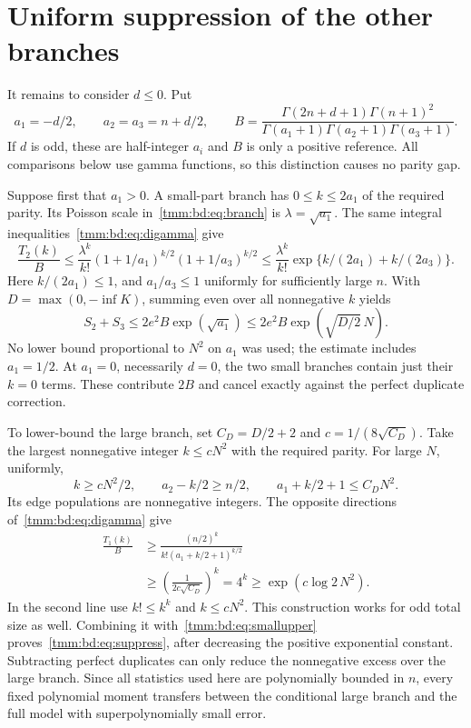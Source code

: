 \documentclass[11pt,letterpaper]{article}
\theoremstyle{remark}\newtheorem{remark}[theorem]{Remark}
\begin{document}
\section{Uniform suppression of the other branches}\label{tmm:bd:sec:suppression}
It remains to consider $d\le0$. Put
\[
 a_1=-d/2,\qquad a_2=a_3=n+d/2,\qquad
 B=\frac{\Gamma(2n+d+1)\Gamma(n+1)^2}
 {\Gamma(a_1+1)\Gamma(a_2+1)\Gamma(a_3+1)}.
\]
If $d$ is odd, these are half-integer $a_i$ and $B$ is only a positive reference. All comparisons below use gamma functions, so this distinction causes no parity gap.

Suppose first that $a_1>0$. A small-part branch has $0\le k\le2a_1$ of the required parity. Its Poisson scale in~\eqref{tmm:bd:eq:branch} is $\lambda=\sqrt{a_1}$. The same integral inequalities~\eqref{tmm:bd:eq:digamma} give
\[
 \frac{T_2(k)}B\le\frac{\lambda^k}{k!}
 (1+1/a_1)^{k/2}(1+1/a_3)^{k/2}
 \le\frac{\lambda^k}{k!}\exp\{k/(2a_1)+k/(2a_3)\}.
\]
Here $k/(2a_1)\le1$, and $a_1/a_3\le1$ uniformly for sufficiently large $n$. With $D=\max(0,-\inf K)$, summing even over all nonnegative $k$ yields
\begin{equation}\label{tmm:bd:eq:smallupper}
 S_2+S_3\le2e^2B\exp(\sqrt{a_1})
 \le2e^2B\exp(\sqrt{D/2}\,N).
\end{equation}
No lower bound proportional to $N^2$ on $a_1$ was used; the estimate includes $a_1=1/2$. At $a_1=0$, necessarily $d=0$, the two small branches contain just their $k=0$ terms. These contribute $2B$ and cancel exactly against the perfect duplicate correction.

To lower-bound the large branch, set $C_D=D/2+2$ and $c=1/(8\sqrt{C_D})$. Take the largest nonnegative integer $k\le cN^2$ with the required parity. For large $N$, uniformly,
\[
 k\ge cN^2/2,\qquad a_2-k/2\ge n/2,\qquad
 a_1+k/2+1\le C_DN^2.
\]
Its edge populations are nonnegative integers. The opposite directions of~\eqref{tmm:bd:eq:digamma} give
\begin{align*}
 \frac{T_1(k)}B
 &\ge\frac{(n/2)^k}{k!(a_1+k/2+1)^{k/2}}\\
 &\ge\left(\frac1{2c\sqrt{C_D}}\right)^k
 =4^k\ge\exp(c\log2\,N^2).
\end{align*}
In the second line use $k!\le k^k$ and $k\le cN^2$. This construction works for odd total size as well. Combining it with~\eqref{tmm:bd:eq:smallupper} proves~\eqref{tmm:bd:eq:suppress}, after decreasing the positive exponential constant. Subtracting perfect duplicates can only reduce the nonnegative excess over the large branch. Since all statistics used here are polynomially bounded in $n$, every fixed polynomial moment transfers between the conditional large branch and the full model with superpolynomially small error.
\end{document}
